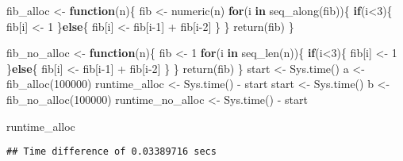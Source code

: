 \documentclass[
]{book}
\newenvironment{Shaded}{\begin{snugshade}}{\end{snugshade}}
\newcommand{\ControlFlowTok}[1]{\textcolor[rgb]{0.13,0.29,0.53}{\textbf{#1}}}
\newcommand{\DecValTok}[1]{\textcolor[rgb]{0.00,0.00,0.81}{#1}}
\newcommand{\FunctionTok}[1]{\textcolor[rgb]{0.00,0.00,0.00}{#1}}
\newcommand{\NormalTok}[1]{#1}
\newcommand{\OtherTok}[1]{\textcolor[rgb]{0.56,0.35,0.01}{#1}}
\newcommand{\SpecialCharTok}[1]{\textcolor[rgb]{0.00,0.00,0.00}{#1}}
\begin{document}
\begin{Shaded}
\begin{Highlighting}[]
\NormalTok{fib\_alloc }\OtherTok{\textless{}{-}} \ControlFlowTok{function}\NormalTok{(n)\{}
\NormalTok{  fib }\OtherTok{\textless{}{-}} \FunctionTok{numeric}\NormalTok{(n)}
  \ControlFlowTok{for}\NormalTok{(i }\ControlFlowTok{in} \FunctionTok{seq\_along}\NormalTok{(fib))\{}
    \ControlFlowTok{if}\NormalTok{(i}\SpecialCharTok{\textless{}}\DecValTok{3}\NormalTok{)\{ }
\NormalTok{      fib[i] }\OtherTok{\textless{}{-}} \DecValTok{1}
\NormalTok{    \}}\ControlFlowTok{else}\NormalTok{\{}
\NormalTok{      fib[i] }\OtherTok{\textless{}{-}}\NormalTok{ fib[i}\DecValTok{{-}1}\NormalTok{] }\SpecialCharTok{+}\NormalTok{ fib[i}\DecValTok{{-}2}\NormalTok{] }
\NormalTok{    \}}
\NormalTok{  \}}
  \FunctionTok{return}\NormalTok{(fib)}
\NormalTok{\}}


\NormalTok{fib\_no\_alloc }\OtherTok{\textless{}{-}} \ControlFlowTok{function}\NormalTok{(n)\{}
\NormalTok{  fib }\OtherTok{\textless{}{-}} \DecValTok{1}
  \ControlFlowTok{for}\NormalTok{(i }\ControlFlowTok{in} \FunctionTok{seq\_len}\NormalTok{(n))\{}
    \ControlFlowTok{if}\NormalTok{(i}\SpecialCharTok{\textless{}}\DecValTok{3}\NormalTok{)\{ }
\NormalTok{      fib[i] }\OtherTok{\textless{}{-}} \DecValTok{1}
\NormalTok{    \}}\ControlFlowTok{else}\NormalTok{\{}
\NormalTok{      fib[i] }\OtherTok{\textless{}{-}}\NormalTok{ fib[i}\DecValTok{{-}1}\NormalTok{] }\SpecialCharTok{+}\NormalTok{ fib[i}\DecValTok{{-}2}\NormalTok{] }
\NormalTok{    \}}
\NormalTok{  \}}
  \FunctionTok{return}\NormalTok{(fib)}
\NormalTok{\}}
\NormalTok{start }\OtherTok{\textless{}{-}} \FunctionTok{Sys.time}\NormalTok{()}
\NormalTok{a }\OtherTok{\textless{}{-}} \FunctionTok{fib\_alloc}\NormalTok{(}\DecValTok{100000}\NormalTok{)}
\NormalTok{runtime\_alloc }\OtherTok{\textless{}{-}} \FunctionTok{Sys.time}\NormalTok{() }\SpecialCharTok{{-}}\NormalTok{ start}
\NormalTok{start }\OtherTok{\textless{}{-}} \FunctionTok{Sys.time}\NormalTok{()}
\NormalTok{b }\OtherTok{\textless{}{-}} \FunctionTok{fib\_no\_alloc}\NormalTok{(}\DecValTok{100000}\NormalTok{)}
\NormalTok{runtime\_no\_alloc }\OtherTok{\textless{}{-}} \FunctionTok{Sys.time}\NormalTok{() }\SpecialCharTok{{-}}\NormalTok{ start}

\NormalTok{runtime\_alloc}
\end{Highlighting}
\end{Shaded}

\begin{verbatim}
## Time difference of 0.03389716 secs
\end{verbatim}
\end{document}
